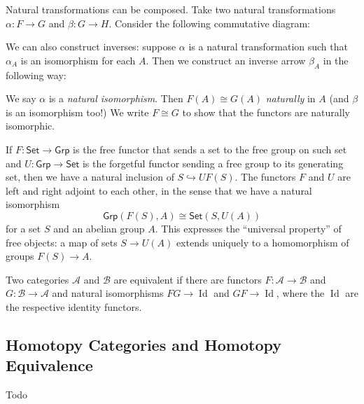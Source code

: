 Natural transformations can be composed. Take two natural transformations $\alpha \colon F \to G$ and $\beta \colon G \to H$. Consider the following commutative diagram: 
            \begin{figure}[H]
                \centering
            \end{figure}
    We can also construct inverses: suppose $\alpha$ is a natural transformation such that $\alpha_A$ is an isomorphism for each $A$. Then we construct an inverse arrow $\beta_A$ in the following way:
            \begin{figure}[H]
                \centering
            \end{figure}
            We say $\alpha$ is a \emph{natural isomorphism}. Then $F(A)\cong G(A)$ \emph{naturally} in $A$ (and $\beta$ is an isomorphism too!) We write $F\cong G$ to show that the functors are naturally isomorphic.
\begin{example}
    If $F \colon \mathsf{Set} \to \mathsf{Grp}$ is the free functor that sends a set to the free group on such set and $U \colon \mathsf{Grp} \to \mathsf{Set}$ is the forgetful functor sending a free group to its generating set, then we have a natural inclusion of $S\hookrightarrow UF(S)$. The functors $F$ and $U$ are left and right adjoint to each other, in the sense that we have a natural isomorphism \[
        \mathsf{Grp}(F(S),A)\cong \mathsf{Set}(S,U(A))
    \] for a set $S$ and an abelian group $A$. This expresses the ``universal property'' of free objects: a map of sets $S\to U(A)$ extends uniquely to a homomorphism of groups $F(S)\to A$. 
\end{example}
\begin{definition}
    Two categories $\mathcal{A}$ and $\mathcal{B}$ are equivalent if there are functors $F \colon \mathcal{A} \to \mathcal{B}$ and $G \colon \mathcal{B} \to \mathcal{A}$ and natural isomorphisms $FG \to \operatorname{Id}$ and $GF \to \operatorname{Id}$, where the $\operatorname{Id}$ are the respective identity functors.
\end{definition}
\subsection{Homotopy Categories and Homotopy Equivalence}
Todo

